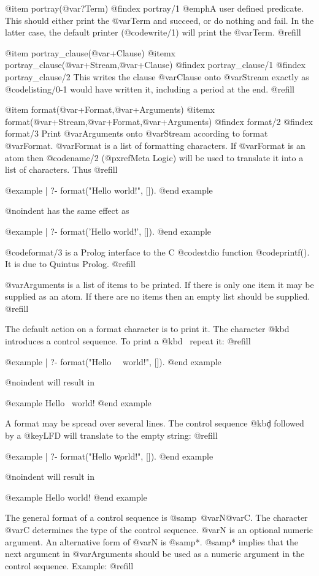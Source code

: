 @item portray(@var{?Term})
@findex portray/1
@emph{A user defined predicate.} This should either print the @var{Term}
and succeed, or do nothing and fail.  In the latter case, the default
printer (@code{write/1}) will print the @var{Term}. @refill

@item portray_clause(@var{+Clause})
@itemx portray_clause(@var{+Stream},@var{+Clause})
@findex portray_clause/1
@findex portray_clause/2
This writes the clause @var{Clause} onto @var{Stream}
exactly as @code{listing/0-1} would have written it, including a period at
the end. @refill

@item format(@var{+Format},@var{+Arguments})
@itemx format(@var{+Stream},@var{+Format},@var{+Arguments})
@findex format/2
@findex format/3
Print @var{Arguments} onto @var{Stream} according to format
@var{Format}.  @var{Format} is a list of formatting characters.  If
@var{Format} is an atom then @code{name/2} (@pxref{Meta Logic}) will be
used to translate it into a list of characters.  Thus @refill

@example
| ?- format("Hello world!", []).
@end example

@noindent
has the same effect as

@example
| ?- format('Hello world!', []).
@end example

@code{format/3} is a Prolog interface to the C @code{stdio} function
@code{printf()}.  It is due to Quintus Prolog.  @refill

@var{Arguments} is a list of items to be printed.  If there is only one item
it may be supplied as an atom.  If there are no items then an empty list should
be supplied. @refill

The default action on a format character is to print it.  The character @kbd{~}
introduces a control sequence.  To print a @kbd{~} repeat it: @refill

@example
| ?- format("Hello ~~world!", []).
@end example

@noindent
will result in

@example
Hello ~world!
@end example

A format may be spread over several lines.  The control sequence @kbd{\c}
followed by a @key{LFD} will translate to the empty string: @refill

@example
| ?- format("Hello \c
world!", []).
@end example

@noindent
will result in

@example
Hello world!
@end example

The general format of a control sequence is @samp{~@var{N}@var{C}}.
The character @var{C} determines the type of the control sequence.
@var{N} is an optional numeric argument.  An alternative form of @var{N}
is @samp{*}. @samp{*} implies that the next argument in @var{Arguments}
should be used as a numeric argument in the control sequence.  Example: @refill

